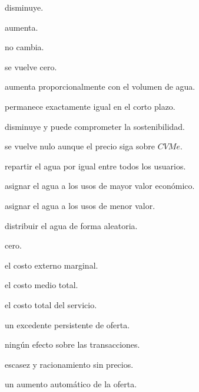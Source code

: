 \begin{opts}
    \item disminuye.
    \item aumenta.
    \item no cambia.
    \item se vuelve cero.
\end{opts}

\begin{opts}
    \item aumenta proporcionalmente con el volumen de agua.
    \item permanece exactamente igual en el corto plazo.
    \item disminuye y puede comprometer la sostenibilidad.
    \item se vuelve nulo aunque el precio siga sobre $CVMe$.
\end{opts}

\begin{opts}
    \item repartir el agua por igual entre todos los usuarios.
    \item asignar el agua a los usos de mayor valor económico.
    \item asignar el agua a los usos de menor valor.
    \item distribuir el agua de forma aleatoria.
\end{opts}

\begin{opts}
    \item cero.
    \item el costo externo marginal.
    \item el costo medio total.
    \item el costo total del servicio.
\end{opts}

\begin{opts}
    \item un excedente persistente de oferta.
    \item ningún efecto sobre las transacciones.
    \item escasez y racionamiento sin precios.
    \item un aumento automático de la oferta.
\end{opts}

